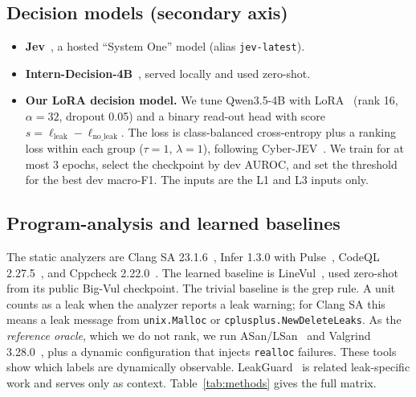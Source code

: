 \documentclass[conference]{IEEEtran}
\newcommand{\code}[1]{\texttt{#1}}
\begin{document}
\subsection{Decision models (secondary axis)}
\begin{itemize}
\item \textbf{Jev}~\cite{typesafejev}, a hosted ``System One'' model (alias \code{jev-latest}).
\item \textbf{Intern-Decision-4B}~\cite{zhu2026interndecision}, served locally and used zero-shot.
\item \textbf{Our LoRA decision model.} We tune Qwen3.5-4B with LoRA~\cite{hu2022lora} (rank 16, $\alpha=32$, dropout 0.05) and a binary read-out head with score $s=\ell_{\text{leak}}-\ell_{\text{no\_leak}}$. %
The loss is class-balanced cross-entropy plus a ranking loss within each group ($\tau=1$, $\lambda=1$), following Cyber-JEV~\cite{zhao2026cyberjev}. %
We train for at most 3 epochs, select the checkpoint by dev AUROC, and set the threshold for the best dev macro-F1. %
The inputs are the L1 and L3 inputs only.
\end{itemize}

\subsection{Program-analysis and learned baselines}
The static analyzers are Clang SA 23.1.6~\cite{clangsa}, Infer 1.3.0 with Pulse~\cite{calcagno2015infer,le2022pulse}, CodeQL 2.27.5~\cite{codeqldocs}, and Cppcheck 2.22.0~\cite{cppcheck}. %
The learned baseline is LineVul~\cite{fu2022linevul}, used zero-shot from its public Big-Vul checkpoint.
The trivial baseline is the grep rule.
A unit counts as a leak when the analyzer reports a leak warning; for Clang SA this means a leak message from \code{unix.Malloc} or \code{cplusplus.NewDeleteLeaks}.
As the \emph{reference oracle}, which we do not rank, we run ASan/LSan~\cite{serebryany2012asan,lsan} and Valgrind 3.28.0~\cite{nethercote2007valgrind}, %
plus a dynamic configuration that injects \code{realloc} failures.
These tools show which labels are dynamically observable.
LeakGuard~\cite{liang2025leakguard} is related leak-specific work and serves only as context.
Table~\ref{tab:methods} gives the full matrix.
\end{document}
